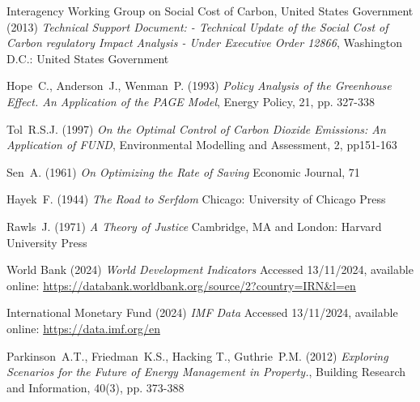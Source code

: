 \documentclass[12pt, oneside]{article}   	%
\begin{document}
\begin{thebibliography}{99}
 Interagency Working Group on Social Cost of Carbon, United States Government (2013)
\emph{Technical Support Document: - Technical Update of the Social Cost of Carbon regulatory Impact Analysis - Under Executive Order 12866},
Washington D.C.: United States Government
		
 Hope~C., Anderson~J., Wenman~P. (1993)
\emph{Policy Analysis of the Greenhouse Effect. An Application of the PAGE Model},
Energy Policy, 21, pp. 327-338
		
 Tol~R.S.J. (1997)
\emph{On the Optimal Control of Carbon Dioxide Emissions: An Application of FUND},
Environmental Modelling and Assessment, 2, pp151-163

 Sen~A. (1961)
\emph{On Optimizing the Rate of Saving}
Economic Journal, 71

 Hayek~F. (1944)
\emph{The Road to Serfdom}
Chicago: University of Chicago Press

 Rawls~J. (1971)
\emph{A Theory of Justice}
Cambridge, MA and London: Harvard University Press

 World Bank (2024)
\emph{World Development Indicators}
Accessed 13/11/2024, available online: 
\url{https://databank.worldbank.org/source/2?country=IRN&l=en}

 International Monetary Fund (2024)
\emph{IMF Data}
Accessed 13/11/2024, available online: 
\url{https://data.imf.org/en}

 Parkinson~A.T., Friedman~K.S., Hacking T., Guthrie~P.M. (2012)
\emph{Exploring Scenarios for the Future of Energy Management in Property.},
Building Research and Information, 40(3), pp. 373-388
	
\end{thebibliography}
\end{document}
